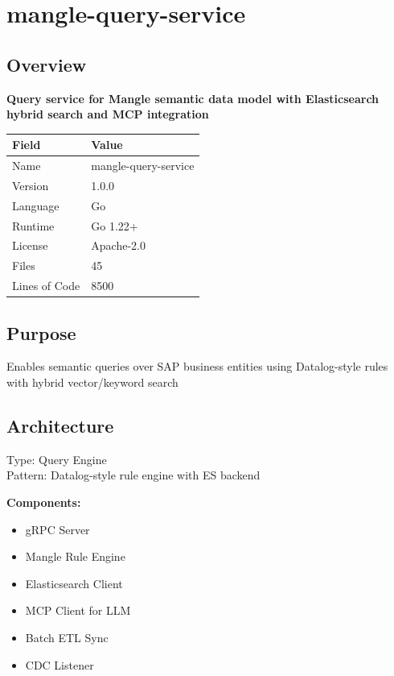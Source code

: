 \documentclass[11pt,a4paper]{article}
\begin{document}
\newpage


\section{mangle-query-service}

\subsection{Overview}

\textbf{Query service for Mangle semantic data model with Elasticsearch hybrid search and MCP integration}

\begin{tabular}{@{}ll@{}}
\toprule
\textbf{Field} & \textbf{Value} \\
\midrule
Name & mangle-query-service \\
Version & 1.0.0 \\
Language & Go \\
Runtime & Go 1.22+ \\
License & Apache-2.0 \\
Files & 45 \\
Lines of Code & 8500 \\
\bottomrule
\end{tabular}

\subsection{Purpose}
Enables semantic queries over SAP business entities using Datalog-style rules with hybrid vector/keyword search

\subsection{Architecture}
Type: Query Engine \\
Pattern: Datalog-style rule engine with ES backend

\textbf{Components:}\begin{itemize}[noitemsep]
\item gRPC Server
\item Mangle Rule Engine
\item Elasticsearch Client
\item MCP Client for LLM
\item Batch ETL Sync
\item CDC Listener
\end{itemize}

\newpage
\end{document}
